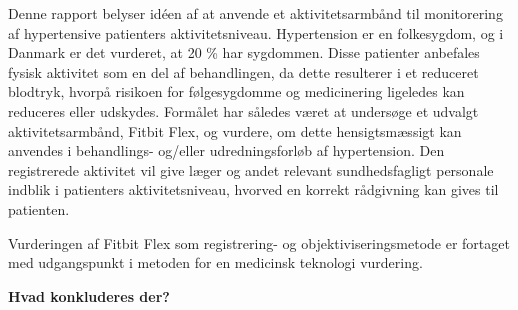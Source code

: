 Denne rapport belyser idéen af at anvende et aktivitetsarmbånd til monitorering af hypertensive patienters aktivitetsniveau. 
Hypertension er en folkesygdom, og i Danmark er det vurderet, at 20 \% har sygdommen. Disse patienter anbefales fysisk aktivitet som en del af behandlingen, da dette resulterer i et reduceret blodtryk, hvorpå risikoen for følgesygdomme og medicinering ligeledes kan reduceres eller udskydes. 
Formålet har således været at undersøge et udvalgt aktivitetsarmbånd, Fitbit Flex, og vurdere, om dette hensigtsmæssigt kan anvendes i behandlings- og/eller udredningsforløb af hypertension. 
Den registrerede aktivitet vil give læger og andet relevant sundhedsfagligt personale indblik i patienters aktivitetsniveau, hvorved en korrekt rådgivning kan gives til patienten. 

Vurderingen af Fitbit Flex som registrering- og objektiviseringsmetode er fortaget med udgangspunkt i metoden for en medicinsk teknologi vurdering.  

\vspace{5cm}

\textbf{Hvad konkluderes der?}